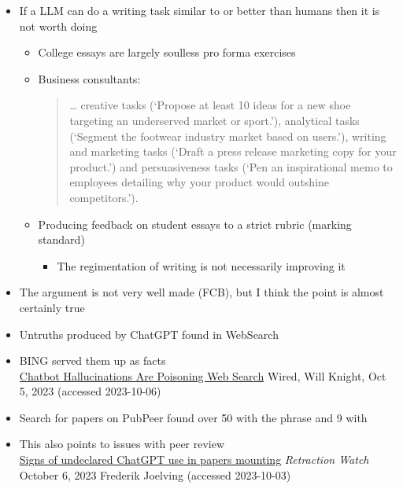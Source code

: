 \documentclass[25pt,a4paper,landscape,headrule,footrule,xetex]{foils}
\begin{document}
\begin{itemize}
\item If a LLM can do a writing task similar to or better than humans
  then it is not worth doing
  \begin{itemize}
  \item College essays are largely soulless pro forma exercises
  \item Business consultants:
    \begin{quote}
      … creative tasks (‘Propose at least 10 ideas for a new shoe targeting an underserved market or sport.’), analytical tasks (‘Segment the footwear industry market based on users.’), writing and marketing tasks (‘Draft a press release marketing copy for your product.’) and persuasiveness tasks (‘Pen an inspirational memo to employees detailing why your product would outshine competitors.’).
    \end{quote}
    
  \item Producing feedback on student essays to a strict rubric
    (marking standard)
    \begin{itemize}
    \item The regimentation of writing is not necessarily improving it
    \end{itemize}
  \end{itemize}
\item The argument is not very well made (FCB), but I think the point is almost certainly true
\end{itemize}



\begin{itemize}
\item Untruths produced by ChatGPT found in WebSearch
\item BING served them up as facts
  \\ {\small \href{https://www.wired.com/story/fast-forward-chatbot-hallucinations-are-poisoning-web-search/}{Chatbot Hallucinations Are Poisoning Web Search} Wired, Will Knight, Oct 5, 2023 (accessed 2023-10-06)}
\item Search for papers on PubPeer found over 50 with the phrase  and 9 with 
\item This also points to issues with peer review
  \\{\small 
\href{https://retractionwatch.com/2023/10/06/signs-of-undeclared-chatgpt-use-in-papers-mounting/}{Signs of undeclared ChatGPT use in papers mounting} \textit{Retraction Watch} October 6, 2023 Frederik Joelving (accessed 2023-10-03)}


\end{itemize}
\end{document}
